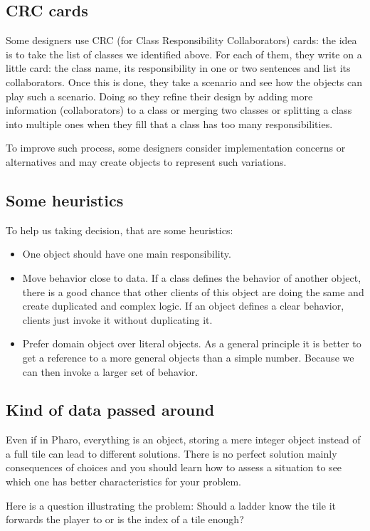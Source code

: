 \documentclass[10pt,twoside,english]{_support/latex/sbabook/sbabook}
\begin{document}
\subsection{CRC cards}
Some designers use CRC (for Class Responsibility Collaborators) cards: 
the idea is to take the list of classes we identified above. For each of them, they write on a little card: the class name, its responsibility in one or two sentences and list its collaborators. Once this is done, they take a scenario and see how the objects can play such a scenario. Doing so they refine their design by adding more information (collaborators) to a class or merging two classes or splitting a class into multiple ones when they fill that a class has too many responsibilities. 

To improve such process, some designers consider implementation concerns 
or alternatives and may create objects to represent such variations.
\subsection{Some heuristics}
To help us taking decision, that are some heuristics: 

\begin{itemize}
\item One object should have one main responsibility.
\item Move behavior close to data. If a class defines the behavior of another object, there is a good chance that other clients of this object are doing the same and create duplicated and complex logic. If an object defines a clear behavior, clients just invoke it without duplicating it.
\item Prefer domain object over literal objects. As a general principle it is better to get a reference to a more general objects than a simple number. Because we can then invoke a larger set of behavior. 
\end{itemize}
\subsection{Kind of data passed around}
Even if in Pharo, everything is an object, storing a mere integer object instead of a full tile can lead to different solutions. There is no perfect solution mainly consequences of choices and you should learn how to assess a situation to see which one has better characteristics for your problem. 

Here is a question illustrating the problem: Should a ladder know the tile it forwards the player to or is the index of a tile enough?
\end{document}
